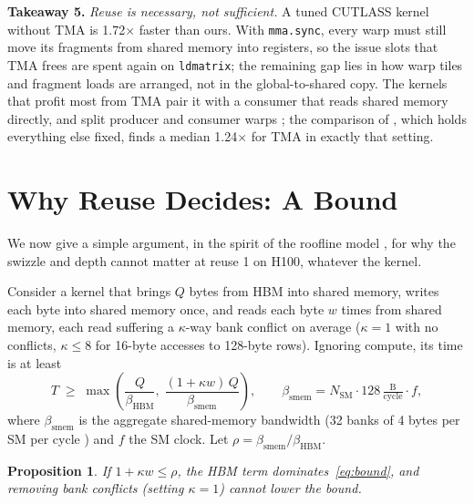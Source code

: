 \documentclass[10pt]{article}
\newtheorem{proposition}{Proposition}
\newcommand{\takeaway}[1]{\noindent\textbf{#1}}
\newcommand{\x}{\ensuremath{\times}}
\begin{document}
\takeaway{Takeaway 5.} \emph{Reuse is necessary, not sufficient.} A tuned CUTLASS kernel without TMA is 1.72\x{} faster
than ours. With \texttt{mma.sync}, every warp must still move its fragments from shared memory into registers, so the issue
slots that TMA frees are spent again on \texttt{ldmatrix}; the remaining gap lies in how warp tiles and fragment loads are
arranged, not in the global-to-shared copy. The kernels that profit most from TMA pair it with a consumer that reads
shared memory directly, and split producer and consumer warps \citep{shah2024flashattention3}; the comparison of
\citet{bose2026tma}, which holds everything else fixed, finds a median 1.24\x{} for TMA in exactly that setting.

\section{Why Reuse Decides: A Bound}
\label{sec:bound}

We now give a simple argument, in the spirit of the roofline model \citep{williams2009roofline}, for why the swizzle and
depth cannot matter at reuse 1 on H100, whatever the kernel.

Consider a kernel that brings $Q$ bytes from HBM into shared memory, writes each byte into shared memory once, and reads
each byte $w$ times from shared memory, each read suffering a $\kappa$-way bank conflict on average ($\kappa=1$ with no
conflicts, $\kappa\le 8$ for 16-byte accesses to 128-byte rows). Ignoring compute, its time is at least
\begin{equation}
  T \;\ge\; \max\!\left( \frac{Q}{\beta_{\mathrm{HBM}}},\; \frac{(1+\kappa w)\,Q}{\beta_{\mathrm{smem}}} \right),
  \qquad \beta_{\mathrm{smem}} = N_{\mathrm{SM}} \cdot 128\,\tfrac{\mathrm{B}}{\mathrm{cycle}} \cdot f,
  \label{eq:bound}
\end{equation}
where $\beta_{\mathrm{smem}}$ is the aggregate shared-memory bandwidth (32 banks of 4 bytes per SM per cycle
\citep{nvidia2026cudaguide}) and $f$ the SM clock. Let $\rho = \beta_{\mathrm{smem}} / \beta_{\mathrm{HBM}}$.

\begin{proposition}
\label{prop:swizzle}
If $1 + \kappa w \le \rho$, the HBM term dominates~\eqref{eq:bound}, and removing bank conflicts (setting $\kappa = 1$)
cannot lower the bound.
\end{proposition}
\end{document}
